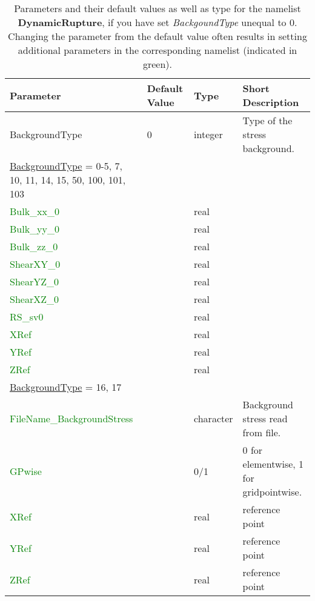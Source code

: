 \documentclass[12pt,twoside]{article}
\begin{document}
\begin{table}[H]
\caption{Parameters and their default values as well as type for the namelist \textbf{DynamicRupture},
         if you have set \textit{BackgoundType}
         unequal to 0. Changing the parameter from the default value often results in
         setting additional parameters in the corresponding namelist (indicated in green).}
\begin{center}
\begin{tabular}{|p{4.8cm}|p{2.4cm}|p{2cm}|p{5cm}|}
\hline
Parameter & Default Value & Type & Short Description \\
\hline
\hline
BackgroundType & 0 & integer & Type of the stress background.\\
\hdashline
\uline{BackgroundType} = 0-5, 7, 10, 11, 14, 15, 50, 100, 101, 103 & & &\\
\textcolor{green}{Bulk\_xx\_0} & & real & \\
\textcolor{green}{Bulk\_yy\_0} & & real & \\
\textcolor{green}{Bulk\_zz\_0} & & real &\\
\textcolor{green}{ShearXY\_0} & & real &\\
\textcolor{green}{ShearYZ\_0} & & real &\\
\textcolor{green}{ShearXZ\_0} & & real &\\
\textcolor{green}{RS\_sv0} & & real &\\
\textcolor{green}{XRef} & & real &\\
\textcolor{green}{YRef} & & real &\\
\textcolor{green}{ZRef} & & real &\\
\hdashline
\uline{BackgroundType} = 16, 17 & & &\\
\textcolor{green}{FileName\_BackgroundStress} & & character & Background stress read from file.\\
\textcolor{green}{GPwise} & & 0/1 & 0 for elementwise, 1 for gridpointwise.\\
\textcolor{green}{XRef} & & real & reference point\\
\textcolor{green}{YRef} & & real & reference point\\
\textcolor{green}{ZRef} & & real & reference point\\
\hline
\end{tabular}
\end{center}
\label{bt-table}
\end{table}

\newpage
\end{document}
